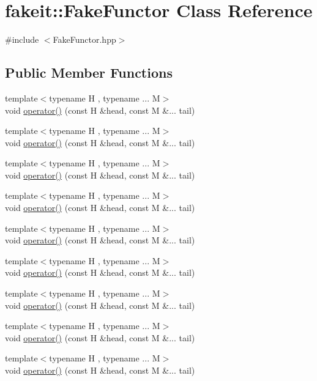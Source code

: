 \hypertarget{classfakeit_1_1FakeFunctor}{}\section{fakeit\+::Fake\+Functor Class Reference}
\label{classfakeit_1_1FakeFunctor}


{\ttfamily \#include $<$Fake\+Functor.\+hpp$>$}

\subsection*{Public Member Functions}
\begin{DoxyCompactItemize}
\item 
{\footnotesize template$<$typename H , typename ... M$>$ }\\void \mbox{\hyperlink{classfakeit_1_1FakeFunctor_a67158c932fcb480a393e4e6f08af17f1}{operator()}} (const H \&head, const M \&... tail)
\item 
{\footnotesize template$<$typename H , typename ... M$>$ }\\void \mbox{\hyperlink{classfakeit_1_1FakeFunctor_a67158c932fcb480a393e4e6f08af17f1}{operator()}} (const H \&head, const M \&... tail)
\item 
{\footnotesize template$<$typename H , typename ... M$>$ }\\void \mbox{\hyperlink{classfakeit_1_1FakeFunctor_a67158c932fcb480a393e4e6f08af17f1}{operator()}} (const H \&head, const M \&... tail)
\item 
{\footnotesize template$<$typename H , typename ... M$>$ }\\void \mbox{\hyperlink{classfakeit_1_1FakeFunctor_a67158c932fcb480a393e4e6f08af17f1}{operator()}} (const H \&head, const M \&... tail)
\item 
{\footnotesize template$<$typename H , typename ... M$>$ }\\void \mbox{\hyperlink{classfakeit_1_1FakeFunctor_a67158c932fcb480a393e4e6f08af17f1}{operator()}} (const H \&head, const M \&... tail)
\item 
{\footnotesize template$<$typename H , typename ... M$>$ }\\void \mbox{\hyperlink{classfakeit_1_1FakeFunctor_a67158c932fcb480a393e4e6f08af17f1}{operator()}} (const H \&head, const M \&... tail)
\item 
{\footnotesize template$<$typename H , typename ... M$>$ }\\void \mbox{\hyperlink{classfakeit_1_1FakeFunctor_a67158c932fcb480a393e4e6f08af17f1}{operator()}} (const H \&head, const M \&... tail)
\item 
{\footnotesize template$<$typename H , typename ... M$>$ }\\void \mbox{\hyperlink{classfakeit_1_1FakeFunctor_a67158c932fcb480a393e4e6f08af17f1}{operator()}} (const H \&head, const M \&... tail)
\item 
{\footnotesize template$<$typename H , typename ... M$>$ }\\void \mbox{\hyperlink{classfakeit_1_1FakeFunctor_a67158c932fcb480a393e4e6f08af17f1}{operator()}} (const H \&head, const M \&... tail)
\end{DoxyCompactItemize}


